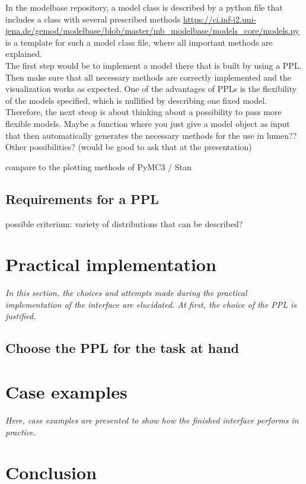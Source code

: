\documentclass{article}
\begin{document}
In the modelbase repository, a model class is described by a python file that includes a class with several prescribed methods \url{https://ci.inf-i2.uni-jena.de/gemod/modelbase/blob/master/mb_modelbase/models_core/models.py} is a template for such a model class file, where all important methods are explained.
\\
The first step would be to implement a model there that is built by using a PPL. Then make sure that all necessary methods are correctly implemented and the visualization works as expected. One of the advantages of PPLs is the flexibility of the models specified, which is nullified by describing one fixed model. Therefore, the next steop is about thinking about a possibility to pass more flexible models. Maybe a function where you just give a model object as input that then automatically generates the necessary methods for the use in lumen??  Other possibilities? (would be good to ask that at the presentation)




compare to the plotting methods of PyMC3 / Stan

\subsection{Requirements for a PPL}

possible criterium: variety of distributions that can be described?




\section{Practical implementation}

\textit{In this section, the choices and attempts made during the practical implementation of the interface are elucidated. At first, the choice of the PPL is justified.}

\subsection{Choose the PPL for the task at hand}

\section{Case examples}

\textit{Here, case examples are presented to show how the finished interface performs in practice.}

\section {Conclusion}
\end{document}

